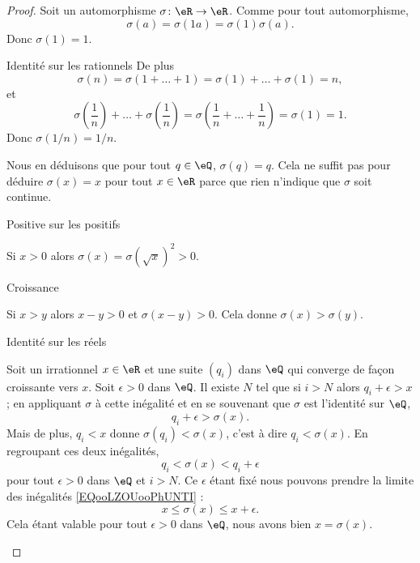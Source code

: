 \begin{proof}
    Soit un automorphisme \( \sigma\colon \eR\to \eR\). Comme pour tout automorphisme,
    \begin{equation}
        \sigma(a)=\sigma(1a)=\sigma(1)\sigma(a).
    \end{equation}
    Donc \( \sigma(1)=1\).

    \begin{subproof}
    \item[Identité sur les rationnels]
    De plus
    \begin{equation}
        \sigma(n)=\sigma(1+\ldots +1)=\sigma(1)+\ldots +\sigma(1)=n,
    \end{equation}
    et
    \begin{equation}
        \sigma\left( \frac{1}{ n } \right)+\ldots +\sigma\left( \frac{1}{ n } \right)=\sigma\left( \frac{1}{ n }+\ldots +\frac{1}{ n } \right)=\sigma(1)=1.
    \end{equation}
    Donc \( \sigma(1/n)=1/n\).

    Nous en déduisons que pour tout \( q\in \eQ\), \( \sigma(q)=q\). Cela ne suffit pas pour déduire \( \sigma(x)=x\) pour tout \( x\in \eR\) parce que rien n'indique que \( \sigma\) soit continue.
        \item[Positive sur les positifs]

            Si \( x>0\) alors \( \sigma(x)=\sigma(\sqrt{ x })^2>0\).

        \item[Croissance]

            Si \( x>y\) alors \( x-y>0\) et \( \sigma(x-y)>0\). Cela donne \( \sigma(x)>\sigma(y)\).

        \item[Identité sur les réels]

            Soit un irrationnel \( x\in \eR\) et une suite \( (q_i)\) dans \( \eQ\) qui converge de façon croissante vers \( x\). Soit \( \epsilon>0\) dans \( \eQ\). Il existe \( N\) tel que si \( i>N\) alors \( q_i+\epsilon>x\); en appliquant \( \sigma\) à cette inégalité et en se souvenant que \( \sigma\) est l'identité sur \( \eQ\),
            \begin{equation}
                q_i+\epsilon>\sigma(x).
            \end{equation}
            Mais de plus, \( q_i<x\) donne \( \sigma(q_i)<\sigma(x)\), c'est à dire \( q_i<\sigma(x)\). En regroupant ces deux inégalités,
            \begin{equation}        \label{EQooLZOUooPhUNTI}
                q_i<\sigma(x)<q_i+\epsilon
            \end{equation}
            pour tout \( \epsilon>0\) dans \( \eQ\) et \( i>N\). Ce \( \epsilon\) étant fixé nous pouvons prendre la limite des inégalités \eqref{EQooLZOUooPhUNTI} :
            \begin{equation}
                x\leq \sigma(x)\leq x+\epsilon.
            \end{equation}
            Cela étant valable pour tout \( \epsilon>0\) dans \( \eQ\), nous avons bien \( x=\sigma(x)\).
    \end{subproof}
\end{proof}

